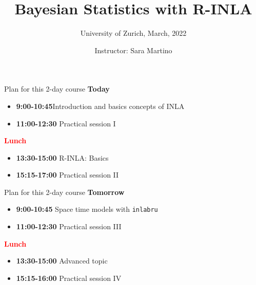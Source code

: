 \documentclass[
  ignorenonframetext,
]{beamer}
\title{Bayesian Statistics with R-INLA}
\subtitle{University of Zurich, March, 2022}
\author{Instructor: Sara Martino}
\date{}
\providecommand{\tightlist}{%
  \setlength{\itemsep}{0pt}\setlength{\parskip}{0pt}}
\begin{document}
\frame{\titlepage}

\begin{frame}[allowframebreaks]
  \tableofcontents[hideallsubsections]
\end{frame}
\begin{frame}
\end{frame}

\begin{frame}{Plan for this 2-day course}
\protect\hypertarget{plan-for-this-2-day-course}{}
\textbf{Today}

\begin{itemize}
\tightlist
\item
  \textbf{9:00-10:45}Introduction and basics concepts of INLA
\item
  \textbf{11:00-12:30} Practical session I
\end{itemize}

\textbf{\textcolor{red}{Lunch}}

\begin{itemize}
\tightlist
\item
  \textbf{13:30-15:00} R-INLA: Basics
\item
  \textbf{15:15-17:00} Practical session II
\end{itemize}
\end{frame}

\begin{frame}[fragile]{Plan for this 2-day course}
\protect\hypertarget{plan-for-this-2-day-course-1}{}
\textbf{Tomorrow}

\begin{itemize}
\tightlist
\item
  \textbf{9:00-10:45} Space time models with \texttt{inlabru}
\item
  \textbf{11:00-12:30} Practical session III
\end{itemize}

\textbf{\textcolor{red}{Lunch}}

\begin{itemize}
\tightlist
\item
  \textbf{13:30-15:00} Advanced topic
\item
  \textbf{15:15-16:00} Practical session IV
\end{itemize}
\end{frame}
\end{document}
